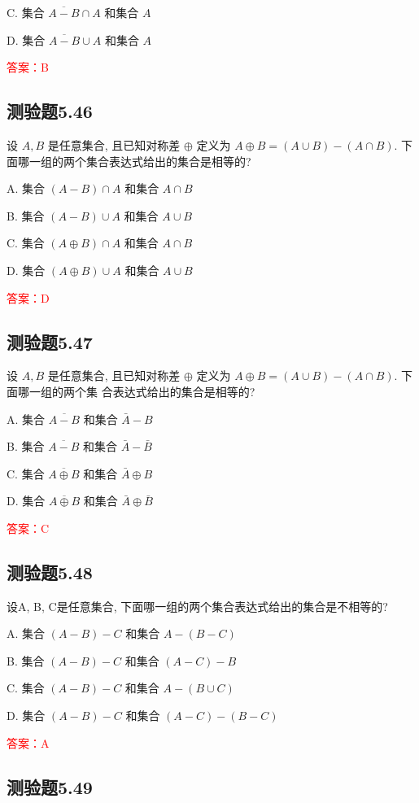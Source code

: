 \documentclass[UTF8, heading=true]{ctexart}
\begin{document}
C. 集合 $\overline{A-B} \cap A$ 和集合 $A$

D. 集合 $\overline{A-B} \cup A$ 和集合 $A$

\textcolor{red}{答案：B}

\subsection{测验题5.46}
设 $A, B$ 是任意集合, 且已知对称差 $\oplus$ 定义为 $A \oplus B=(A \cup B)-(A \cap B)$. 下面哪一组的两个集合表达式给出的集合是相等的?

A. 集合 $(A-B) \cap A$ 和集合 $A \cap B$

B. 集合 $(A-B) \cup A$ 和集合 $A \cup B$

C. 集合 $(A \oplus B) \cap A$ 和集合 $A \cap B$

D. 集合 $(A \oplus B) \cup A$ 和集合 $A \cup B$

\textcolor{red}{答案：D}


\subsection{测验题5.47}

设 $A, B$ 是任意集合, 且已知对称差 $\oplus$ 定义为 $A \oplus B=(A \cup B)-(A \cap B)$. 下面哪一组的两个集
合表达式给出的集合是相等的?

A. 集合 $\overline{A-B}$ 和集合 $\bar{A}-B$

B. 集合 $\overline{A-B}$ 和集合 $\bar{A}-\bar{B}$

C. 集合 $\overline{A \oplus B}$ 和集合 $\bar{A} \oplus B$

D. 集合 $\overline{A \oplus B}$ 和集合 $\bar{A} \oplus \bar{B}$

\textcolor{red}{答案：C}

\subsection{测验题5.48}
设A, B, C是任意集合, 下面哪一组的两个集合表达式给出的集合是不相等的?

A. 
集合 $(A-B)-C$ 和集合 $A-(B-C)$

B. 
集合 $(A-B)-C$ 和集合 $(A-C)-B$

C. 
集合 $(A-B)-C$ 和集合 $A-(B \cup C)$

D. 
集合 $(A-B)-C$ 和集合 $(A-C)-(B-C)$

\textcolor{red}{答案：A}

\subsection{测验题5.49}
\end{document}
